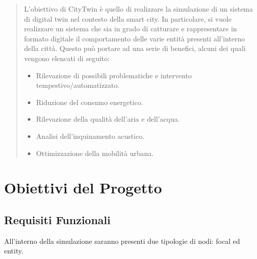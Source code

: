 \documentclass[12pt,a4paper,openright,twoside]{book}
\begin{document}
	
\frontmatter



\begin{abstract}
    L'obiettivo di CityTwin è quello di realizzare la simulazione di un sistema di digital twin nel contesto della smart city. In particolare, si vuole realizzare un sistema che sia in grado di catturare e rappresentare in formato digitale il comportamento delle varie entità presenti all'interno della città. Questo può portare ad una serie di benefici, alcuni dei quali vengono elencati di seguito:
    \begin{itemize}
        \item Rilevazione di possibili problematiche e intervento tempestivo/automatizzato.
        \item Riduzione del consumo energetico.
        \item Rilevazione della qualità dell'aria e dell'acqua.
        \item Analisi dell'inquinamento acustico.
        \item Ottimizzazione della mobilità urbana.
    \end{itemize}
\end{abstract}

\tableofcontents   

\mainmatter

\chapter{Obiettivi del Progetto}
\label{chap:goals}

\section{Requisiti Funzionali}

All'interno della simulazione saranno presenti due tipologie di nodi: focal ed entity.
\end{document}
